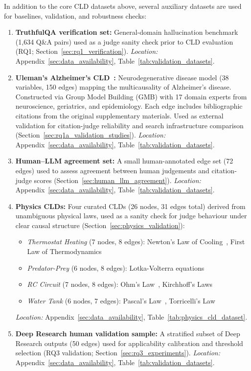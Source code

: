 In addition to the core CLD datasets above, several auxiliary datasets are used for baselines, validation, and robustness checks:
\begin{enumerate}[noitemsep]
    \item \textbf{TruthfulQA verification set:} General-domain hallucination benchmark (1,634 Q\&A pairs) used as a judge sanity check prior to CLD evaluation (RQ1; Section~\ref{sec:rq1_verification}). \textit{Location:} Appendix~\ref{sec:data_availability}, Table~\ref{tab:validation_datasets}.
    \item \textbf{Uleman's Alzheimer's CLD~\cite{uleman2021mapping}:} Neurodegenerative disease model (38 variables, 150 edges) mapping the multicausality of Alzheimer's disease. Constructed via Group Model Building (GMB) with 17 domain experts from neuroscience, geriatrics, and epidemiology. Each edge includes bibliographic citations from the original supplementary materials. Used as external validation for citation-judge reliability and search infrastructure comparison (Section~\ref{sec:rq1a_validation_studies}). \textit{Location:} Appendix~\ref{sec:data_availability}, Table~\ref{tab:validation_datasets}.
    \item \textbf{Human--LLM agreement set:} A small human-annotated edge set (72 edges) used to assess agreement between human judgements and citation-judge scores (Section~\ref{sec:human_llm_agreement}). \textit{Location:} Appendix~\ref{sec:data_availability}, Table~\ref{tab:validation_datasets}.
    \item \textbf{Physics CLDs:} Four curated CLDs (26 nodes, 31 edges total) derived from unambiguous physical laws, used as a sanity check for judge behaviour under clear causal structure (Section~\ref{sec:physics_validation}):
    \begin{itemize}[noitemsep,topsep=2pt]
        \item \textit{Thermostat Heating} (7 nodes, 8 edges): Newton's Law of Cooling~\cite{newton1701scala}, First Law of Thermodynamics~\cite{clausius1850heat}
        \item \textit{Predator-Prey} (6 nodes, 8 edges): Lotka-Volterra equations~\cite{lotka1925elements,volterra1928fluctuations}
        \item \textit{RC Circuit} (7 nodes, 8 edges): Ohm's Law~\cite{ohm1827galvanische}, Kirchhoff's Laws~\cite{kirchhoff1845durchgang}
        \item \textit{Water Tank} (6 nodes, 7 edges): Pascal's Law~\cite{pascal1663equilibre}, Torricelli's Law~\cite{torricelli1644opera}
    \end{itemize}
    \textit{Location:} Appendix~\ref{sec:data_availability}, Table~\ref{tab:physics_cld_dataset}.
    \item \textbf{Deep Research human validation sample:} A stratified subset of Deep Research outputs (50 edges) used for applicability calibration and threshold selection (RQ3 validation; Section~\ref{sec:rq3_experiments}). \textit{Location:} Appendix~\ref{sec:data_availability}, Table~\ref{tab:validation_datasets}.
\end{enumerate}
